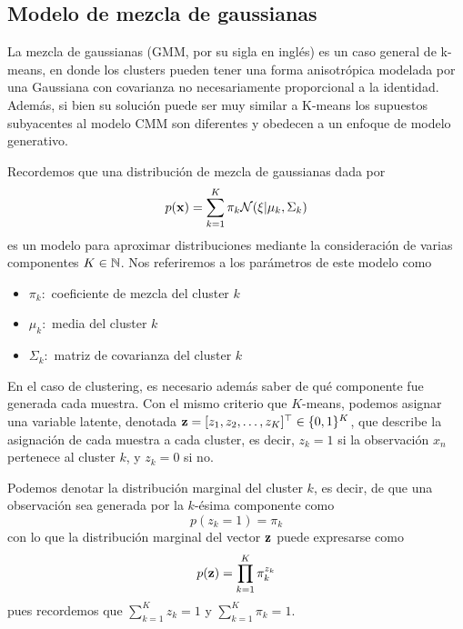 \subsection{Modelo de mezcla de gaussianas}

La mezcla de gaussianas (GMM, por su sigla en inglés) es un caso general de k-means, en donde los clusters pueden tener una forma anisotrópica modelada por una Gaussiana con covarianza no necesariamente proporcional a la identidad. Además, si bien su solución puede ser muy similar a K-means los supuestos subyacentes al modelo CMM son diferentes y obedecen a un enfoque de modelo generativo. 

Recordemos que una distribución de mezcla de gaussianas dada por 
\begin{align}
p(\mathbf{x}) = \sum_{k=1}^K \pi_k \mathcal{N}(\xi| \mu_k,\Sigma_k)
\end{align}
es un modelo para aproximar distribuciones mediante la consideración de varias componentes $K\in{\mathbb N}$. Nos referiremos a los parámetros de este modelo como 

\begin{itemize}
	\item $\pi_k:$ coeficiente de mezcla del cluster  $k$
	\item $\mu_k:$ media del cluster  $k$
	\item $\Sigma_k:$ matriz de covarianza del cluster  $k$
\end{itemize}

En el caso de clustering, es necesario además saber de qué componente fue generada cada muestra. Con el mismo criterio que $K$-means, podemos asignar una variable latente, denotada $\mathbf{z} = [z_1,z_2,\ldots,z_K]^\top\in\{0,1\}^K$, que describe la asignación de cada muestra a cada cluster, es decir, $z_{k}=1$ si la observación $x_n$ pertenece al cluster $k$, y $z_{k}=0$ si no. 

Podemos denotar la distribución marginal del cluster $k$, es decir, de que una observación sea generada por la $k$-ésima componente como 
\begin{equation}
 	p(z_k=1) = \pi_k \label{eq:GMM_marg1}
\end{equation} 
con lo que la distribución marginal del vector $\mathbf{z}$ puede expresarse como 
\begin{equation}
	p(\mathbf{z}) = \prod_{k=1}^K \pi_k^{z_k} \label{eq:GMM_marg2}
\end{equation}
pues recordemos que $\sum_{k=1}^K {z_k} =1$ y $\sum_{k=1}^K {\pi_k}=1$. 

